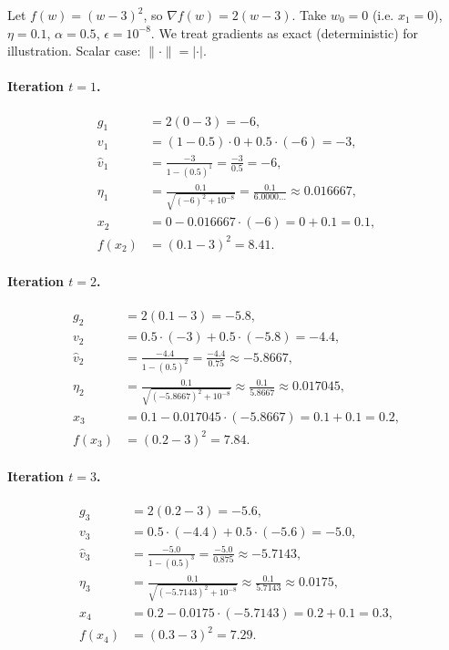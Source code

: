 \documentclass[11pt]{article}
\begin{document}
Let $f(w) = (w-3)^2$, so $\nabla f(w) = 2(w-3)$.
Take $w_0 = 0$ (i.e. $x_1 = 0$), $\eta = 0.1$, $\alpha = 0.5$, $\epsilon = 10^{-8}$.
We treat gradients as exact (deterministic) for illustration. Scalar case: $\|\cdot\|=|\cdot|$.

\paragraph{Iteration $t=1$.}
\begin{align*}
g_1 &= 2(0-3) = -6,\\
v_1 &= (1-0.5)\cdot 0 + 0.5\cdot(-6) = -3,\\
\hat v_1 &= \frac{-3}{1-(0.5)^1} = \frac{-3}{0.5} = -6,\\
\eta_1 &= \frac{0.1}{\sqrt{(-6)^2+10^{-8}}} = \frac{0.1}{6.0000\ldots} \approx 0.016667,\\
x_2 &= 0 - 0.016667\cdot(-6) = 0 + 0.1 = 0.1,\\
f(x_2) &= (0.1-3)^2 = 8.41.
\end{align*}

\paragraph{Iteration $t=2$.}
\begin{align*}
g_2 &= 2(0.1-3) = -5.8,\\
v_2 &= 0.5\cdot(-3) + 0.5\cdot(-5.8) = -4.4,\\
\hat v_2 &= \frac{-4.4}{1-(0.5)^2} = \frac{-4.4}{0.75} \approx -5.8667,\\
\eta_2 &= \frac{0.1}{\sqrt{(-5.8667)^2+10^{-8}}} \approx \frac{0.1}{5.8667} \approx 0.017045,\\
x_3 &= 0.1 - 0.017045\cdot(-5.8667) = 0.1 + 0.1 = 0.2,\\
f(x_3) &= (0.2-3)^2 = 7.84.
\end{align*}

\paragraph{Iteration $t=3$.}
\begin{align*}
g_3 &= 2(0.2-3) = -5.6,\\
v_3 &= 0.5\cdot(-4.4) + 0.5\cdot(-5.6) = -5.0,\\
\hat v_3 &= \frac{-5.0}{1-(0.5)^3} = \frac{-5.0}{0.875} \approx -5.7143,\\
\eta_3 &= \frac{0.1}{\sqrt{(-5.7143)^2+10^{-8}}} \approx \frac{0.1}{5.7143} \approx 0.0175,\\
x_4 &= 0.2 - 0.0175\cdot(-5.7143) = 0.2 + 0.1 = 0.3,\\
f(x_4) &= (0.3-3)^2 = 7.29.
\end{align*}
\end{document}
